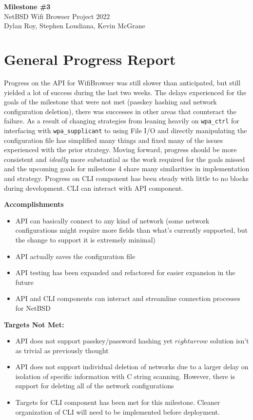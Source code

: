 \documentclass[11pt]{article}
\begin{document}
\begin{center}
  \textbf{\Large Milestone \#3}\\\large NetBSD Wifi Browser Project 2022\\
  Dylan Roy, Stephen Loudiana, Kevin McGrane
\end{center}


\section{General Progress Report}
Progress on the API for WifiBrowser was still slower than anticipated, but still yielded a lot of success
during the last two weeks. The delays experienced for the goals of the milestone that were not met
(passkey hashing and network configuration deletion), there was successes in other areas that counteract
the failure. As a result of changing strategies from leaning heavily on \texttt{wpa\_ctrl} for interfacing
with \texttt{wpa\_supplicant} to using File I/O and directly manipulating the configuration file has
simplified many things and fixed many of the issues experienced with the prior strategy. Moving forward,
progress should be more consistent and \textit{ideally} more substantial as the work required for the goals
missed and the upcoming goals for milestone 4 share many similarities in implementation and strategy.
Progress on CLI component has been steady with little to no blocks during development. CLI can interact 
with API component. 

\textbf{Accomplishments}
\begin{itemize}
  \item API can basically connect to any kind of network (some network configurations might require more
    fields than what's currently supported, but the change to support it is extremely minimal)
  \item API actually saves the configuration file
  \item API testing has been expanded and refactored for easier expansion in the future
  \item API and CLI components can interact and streamline connection processes for NetBSD
\end{itemize}

\textbf{Targets Not Met:}
\begin{itemize}
  \item API does not support passkey/password hashing yet $rightarrow$ solution isn't as trivial as previously
    thought
  \item API does not support individual deletion of networks due to a larger delay on isolation of specific information
    with C string scanning. However, there is support for deleting all of the network configurations
  \item Targets for CLI component has been met for this milestone. Cleaner organization of CLI will need to be implemented 
    before deployment. 
\end{itemize}
\end{document}

